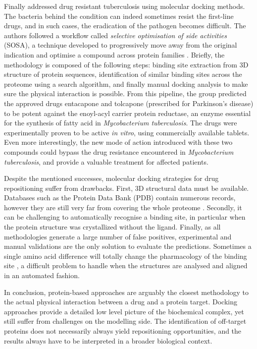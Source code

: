 Finally \cite{kinnings2009drug} addressed drug resistant tuberculosis using molecular docking methods. The bacteria behind the condition can indeed sometimes resist the first-line drugs, and in such cases, the eradication of the pathogen becomes difficult. The authors followed a workflow called \emph{selective optimisation of side activities} (SOSA), a technique developed to progressively move away from the original indication and optimise a compound across protein families \citep{wermuth2006selective}. Briefly, the methodology is composed of the following steps: binding site extraction from 3D structure of protein sequences, identification of similar binding sites across the proteome using a search algorithm, and finally manual docking analysis to make sure the physical interaction is possible. From this pipeline, the group predicted the approved drugs entacapone and tolcapone (prescribed for Parkinson's disease) to be potent against the enoyl-acyl carrier protein reductase, an enzyme essential for the synthesis of fatty acid in \emph{Mycobacterium tuberculosis}. The drugs were experimentally proven to be active \emph{in vitro}, using commercially available tablets. Even more interestingly, the new mode of action introduced with these two compounds could bypass the drug resistance encountered in \emph{Mycobacterium tuberculosis}, and provide a valuable treatment for affected patients.

Despite the mentioned successes, molecular docking strategies for drug repositioning suffer from drawbacks. First, 3D structural data must be available. Databases such as the Protein Data Bank (PDB) contain numerous records, however they are still very far from covering the whole proteome \citep{haupt2011old}. Secondly, it can be challenging to automatically recognise a binding site, in particular when the protein structure was crystallized without the ligand. Finally, as all methodologies generate a large number of false positives, experimental and manual validations are the only solution to evaluate the predictions. Sometimes a single amino acid difference will totally change the pharmacology of the binding site \citep{kruger2012mapping}, a difficult problem to handle when the structures are analysed and aligned in an automated fashion.

In conclusion, protein-based approaches are arguably the closest methodology to the actual physical interaction between a drug and a protein target. Docking approaches provide a detailed low level picture of the biochemical complex, yet still suffer from challenges on the modelling side. The identification of off-target proteins does not necessarily always yield repositioning opportunities, and the results always have to be interpreted in a broader biological context.

